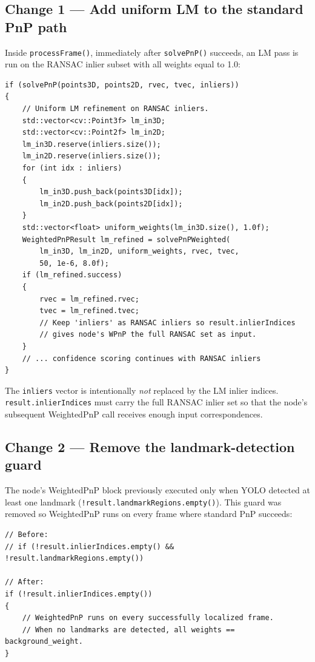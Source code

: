 \documentclass[12pt,a4paper]{article}
\begin{document}
\subsection{Change 1 — Add uniform LM to the standard PnP path}

Inside \texttt{processFrame()}, immediately after \texttt{solvePnP()} succeeds, an
LM pass is run on the RANSAC inlier subset with all weights equal to 1.0:

\begin{lstlisting}[style=cpp,
  caption={Uniform LM block added to \texttt{processFrame()} ---
           \texttt{relocalization.cpp}}]
if (solvePnP(points3D, points2D, rvec, tvec, inliers))
{
    // Uniform LM refinement on RANSAC inliers.
    std::vector<cv::Point3f> lm_in3D;
    std::vector<cv::Point2f> lm_in2D;
    lm_in3D.reserve(inliers.size());
    lm_in2D.reserve(inliers.size());
    for (int idx : inliers)
    {
        lm_in3D.push_back(points3D[idx]);
        lm_in2D.push_back(points2D[idx]);
    }
    std::vector<float> uniform_weights(lm_in3D.size(), 1.0f);
    WeightedPnPResult lm_refined = solvePnPWeighted(
        lm_in3D, lm_in2D, uniform_weights, rvec, tvec,
        50, 1e-6, 8.0f);
    if (lm_refined.success)
    {
        rvec = lm_refined.rvec;
        tvec = lm_refined.tvec;
        // Keep 'inliers' as RANSAC inliers so result.inlierIndices
        // gives node's WPnP the full RANSAC set as input.
    }
    // ... confidence scoring continues with RANSAC inliers
}
\end{lstlisting}

\begin{notebox}
The \texttt{inliers} vector is intentionally \emph{not} replaced by the LM inlier
indices. \texttt{result.inlierIndices} must carry the full RANSAC inlier set so that
the node's subsequent WeightedPnP call receives enough input correspondences.
\end{notebox}

\subsection{Change 2 — Remove the landmark-detection guard}

The node's WeightedPnP block previously executed only when YOLO detected at least
one landmark (\texttt{!result.landmarkRegions.empty()}). This guard was removed so
WeightedPnP runs on every frame where standard PnP succeeds:

\begin{lstlisting}[style=cpp,
  caption={Guard removed in \texttt{relocalization\_node.cpp}}]
// Before:
// if (!result.inlierIndices.empty() && !result.landmarkRegions.empty())

// After:
if (!result.inlierIndices.empty())
{
    // WeightedPnP runs on every successfully localized frame.
    // When no landmarks are detected, all weights == background_weight.
}
\end{lstlisting}
\end{document}
